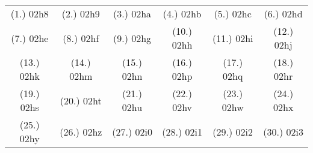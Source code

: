 \begin{exercises}{}
{%
\par \practiceinfo
\par \begin{tabular}[h]{cccccc}
(1.)	02h8	&
(2.)	02h9	&
(3.)	02ha	&
(4.)	02hb	&
(5.)	02hc	&
(6.)	02hd	\\ %
(7.)	02he	&
(8.)	02hf	&
(9.)	02hg	&
(10.)	02hh	&
(11.)	02hi	&
(12.)	02hj	\\ %
(13.)	02hk	&
(14.)	02hm	&
(15.)	02hn	&
(16.)	02hp	&
(17.)	02hq	&
(18.)	02hr	\\ %
(19.)	02hs	&
(20.)	02ht	&
(21.)	02hu	&
(22.)	02hv	&
(23.)	02hw	&
(24.)	02hx	\\ %
(25.)	02hy	&
(26.)	02hz	&
(27.)	02i0	&
(28.)	02i1	&
(29.)	02i2	&
(30.)	02i3	\\ %
\end{tabular}
}
\end{exercises}
\clearpage
{}



